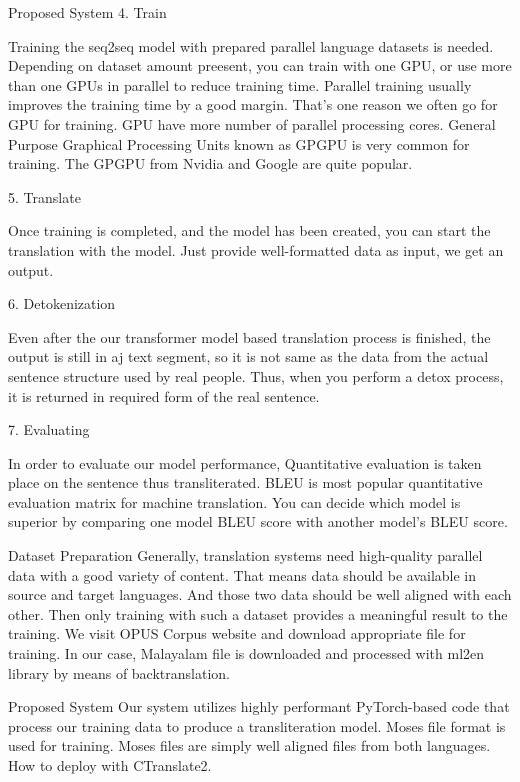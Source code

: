 \begin{chapter}{Proposed System}
4. Train

Training the seq2seq model with prepared parallel language datasets is needed. Depending on dataset amount preesent, you can train with one GPU, or use more than one GPUs in parallel to reduce training time. Parallel training usually improves the training time by a good margin. That's one reason we often go for GPU for training. GPU have more number of parallel processing cores. General Purpose Graphical Processing Units known as GPGPU is very common for training. The GPGPU from Nvidia and Google are quite popular.

5. Translate

Once training is completed, and the model has been created, you can start the translation with the model. Just provide well-formatted data as input, we get an output.

6. Detokenization

Even after the our transformer model based translation process is finished, the output is still in aj text segment, so it is not same as the data from the actual sentence structure used by real people. Thus, when you perform a detox process, it is returned in required form of the real sentence.

7. Evaluating

In order to evaluate our model performance, Quantitative evaluation is taken place on the sentence thus transliterated. BLEU is most popular  quantitative evaluation matrix for machine translation. You can decide which model is superior by comparing one model BLEU score with another model's BLEU score.

    \begin{section}{Dataset Preparation}
    Generally, translation systems need high-quality parallel data with a good variety of content. That means data should be available in source and target languages. And those two data should be well aligned with each other. Then only training with such a dataset provides a meaningful result to the training. We visit OPUS Corpus website and download appropriate file for training. In our case, Malayalam file is downloaded and processed with ml2en library by means of backtranslation.
    \end{section}

    \begin{section}{Proposed System}
    Our system utilizes highly performant PyTorch-based code that process our training data to produce a transliteration model. Moses file format is used for training. Moses files are simply well aligned files from both languages. How to deploy with CTranslate2.


\end{section}
\end{chapter}
